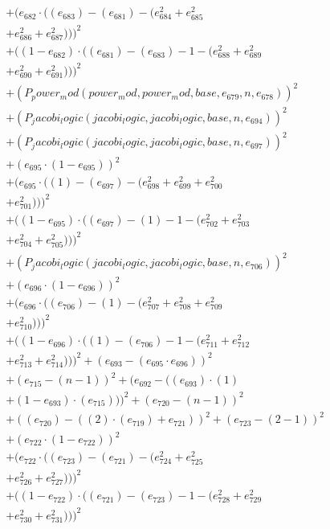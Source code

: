 \documentclass[10pt, a4paper]{article}
\begin{document}
\begin{small}
\begin{align*}
& + (e_{682}  \cdot  ((e_{683}) - (e_{681}) - (e_{684}^{2} + e_{685}^{2} \\
& + e_{686}^{2} + e_{687}^{2})))^{2} \\
& + ((1 - e_{682})  \cdot  ((e_{681}) - (e_{683}) - 1 - (e_{688}^{2} + e_{689}^{2} \\
& + e_{690}^{2} + e_{691}^{2})))^{2} \\
& + (P_power_mod(power_mod, power_mod, base, e_{679}, n, e_{678}))^{2} \\
& + (P_jacobi_logic(jacobi_logic, jacobi_logic, base, n, e_{694}))^{2} \\
& + (P_jacobi_logic(jacobi_logic, jacobi_logic, base, n, e_{697}))^{2} \\
& + (e_{695}  \cdot  (1 - e_{695}))^{2} \\
& + (e_{695}  \cdot  ((1) - (e_{697}) - (e_{698}^{2} + e_{699}^{2} + e_{700}^{2} \\
& + e_{701}^{2})))^{2} \\
& + ((1 - e_{695})  \cdot  ((e_{697}) - (1) - 1 - (e_{702}^{2} + e_{703}^{2} \\
& + e_{704}^{2} + e_{705}^{2})))^{2} \\
& + (P_jacobi_logic(jacobi_logic, jacobi_logic, base, n, e_{706}))^{2} \\
& + (e_{696}  \cdot  (1 - e_{696}))^{2} \\
& + (e_{696}  \cdot  ((e_{706}) - (1) - (e_{707}^{2} + e_{708}^{2} + e_{709}^{2} \\
& + e_{710}^{2})))^{2} \\
& + ((1 - e_{696})  \cdot  ((1) - (e_{706}) - 1 - (e_{711}^{2} + e_{712}^{2} \\
& + e_{713}^{2} + e_{714}^{2})))^{2} + (e_{693} - (e_{695}  \cdot  e_{696}))^{2} \\
& + (e_{715} - (n - 1))^{2} + (e_{692} - ((e_{693})  \cdot  (1) \\
& + (1 - e_{693})  \cdot  (e_{715})))^{2} + (e_{720} - (n - 1))^{2} \\
& + ((e_{720}) - ((2)  \cdot  (e_{719}) + e_{721}))^{2} + (e_{723} - (2 - 1))^{2} \\
& + (e_{722}  \cdot  (1 - e_{722}))^{2} \\
& + (e_{722}  \cdot  ((e_{723}) - (e_{721}) - (e_{724}^{2} + e_{725}^{2} \\
& + e_{726}^{2} + e_{727}^{2})))^{2} \\
& + ((1 - e_{722})  \cdot  ((e_{721}) - (e_{723}) - 1 - (e_{728}^{2} + e_{729}^{2} \\
& + e_{730}^{2} + e_{731}^{2})))^{2} \\

\end{align*}
\end{small}
\end{document}
